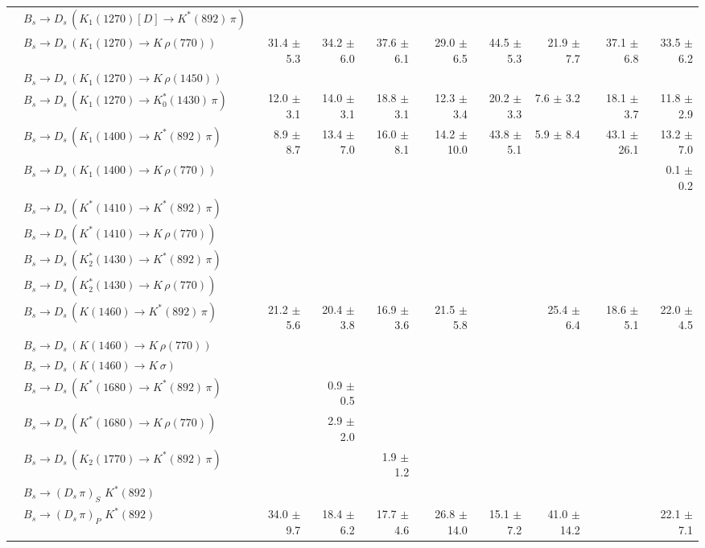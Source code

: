 \begin{tabular}{l l  r  r  r  r  r  r  r  r  }
 & $B_s \to D_s \, ( K_1(1270)[D] \to K^{*}(892) \, \pi )$ &  &  &  &  &  &  &  &  \\ 
 & $B_s \to D_s \, ( K_1(1270) \to K \, \rho(770) )$ & 31.4 $\pm$ 5.3 & 34.2 $\pm$ 6.0 & 37.6 $\pm$ 6.1 & 29.0 $\pm$ 6.5 & 44.5 $\pm$ 5.3 & 21.9 $\pm$ 7.7 & 37.1 $\pm$ 6.8 & 33.5 $\pm$ 6.2 \\ 
 & $B_s \to D_s \, ( K_1(1270) \to K \, \rho(1450) )$ &  &  &  &  &  &  &  &  \\ 
 & $B_s \to D_s \, ( K_1(1270) \to K^{*}_{0}(1430) \, \pi )$ & 12.0 $\pm$ 3.1 & 14.0 $\pm$ 3.1 & 18.8 $\pm$ 3.1 & 12.3 $\pm$ 3.4 & 20.2 $\pm$ 3.3 & 7.6 $\pm$ 3.2 & 18.1 $\pm$ 3.7 & 11.8 $\pm$ 2.9 \\ 
 & $B_s \to D_s \, ( K_1(1400) \to K^{*}(892) \, \pi )$ & 8.9 $\pm$ 8.7 & 13.4 $\pm$ 7.0 & 16.0 $\pm$ 8.1 & 14.2 $\pm$ 10.0 & 43.8 $\pm$ 5.1 & 5.9 $\pm$ 8.4 & 43.1 $\pm$ 26.1 & 13.2 $\pm$ 7.0 \\ 
 & $B_s \to D_s \, ( K_1(1400) \to K \, \rho(770) )$ &  &  &  &  &  &  &  & 0.1 $\pm$ 0.2 \\ 
 & $B_s \to D_s \, ( K^{*}(1410) \to K^{*}(892) \, \pi )$ &  &  &  &  &  &  &  &  \\ 
 & $B_s \to D_s \, ( K^{*}(1410) \to K \, \rho(770) )$ &  &  &  &  &  &  &  &  \\ 
 & $B_s \to D_s \, ( K_2^{*}(1430) \to K^{*}(892) \, \pi )$ &  &  &  &  &  &  &  &  \\ 
 & $B_s \to D_s \, ( K_2^{*}(1430) \to K \, \rho(770) )$ &  &  &  &  &  &  &  &  \\ 
 & $B_s \to D_s \, ( K(1460) \to K^{*}(892) \, \pi )$ & 21.2 $\pm$ 5.6 & 20.4 $\pm$ 3.8 & 16.9 $\pm$ 3.6 & 21.5 $\pm$ 5.8 &  & 25.4 $\pm$ 6.4 & 18.6 $\pm$ 5.1 & 22.0 $\pm$ 4.5 \\ 
 & $B_s \to D_s \, ( K(1460) \to K \, \rho(770) )$ &  &  &  &  &  &  &  &  \\ 
 & $B_s \to D_s \, ( K(1460) \to K \, \sigma )$ &  &  &  &  &  &  &  &  \\ 
 & $B_s \to D_s \, ( K^{*}(1680) \to K^{*}(892) \, \pi )$ &  & 0.9 $\pm$ 0.5 &  &  &  &  &  &  \\ 
 & $B_s \to D_s \, ( K^{*}(1680) \to K \, \rho(770) )$ &  & 2.9 $\pm$ 2.0 &  &  &  &  &  &  \\ 
 & $B_s \to D_s \, ( K_2(1770) \to K^{*}(892) \, \pi )$ &  &  & 1.9 $\pm$ 1.2 &  &  &  &  &  \\ 
 & $B_s \to ( D_s \, \pi)_{S} \, \, K^{*}(892)$ &  &  &  &  &  &  &  &  \\ 
 & $B_s \to ( D_s \, \pi)_{P} \, \, K^{*}(892)$ & 34.0 $\pm$ 9.7 & 18.4 $\pm$ 6.2 & 17.7 $\pm$ 4.6 & 26.8 $\pm$ 14.0 & 15.1 $\pm$ 7.2 & 41.0 $\pm$ 14.2 &  & 22.1 $\pm$ 7.1 \\ 

\end{tabular}
